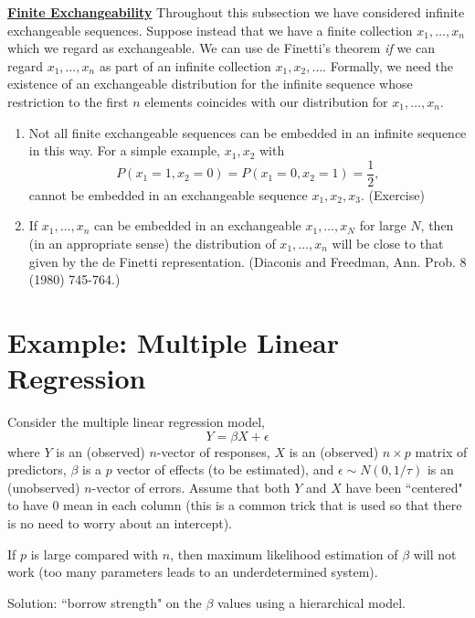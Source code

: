\documentclass{article}
\begin{document}
\newpage

\underline{\bf Finite Exchangeability}
\vskip 4mm
Throughout this subsection we have considered infinite exchangeable
sequences.  Suppose instead that we have a finite collection
$x_1,\ldots,x_n$ which we regard as exchangeable.  We can use de
Finetti's theorem {\it if} we can regard $x_1,\ldots,x_n$ as part of an
infinite collection $x_1,x_2,\ldots$.  Formally, we need the existence of
an exchangeable distribution for the infinite sequence whose
restriction to the first $n$ elements coincides with our distribution
for $x_1,\ldots,x_n$.
\begin{enumerate}
\item Not all finite exchangeable sequences can be embedded in an infinite
sequence in this way.  For a simple example, $x_1,x_2$ with
$$P(x_1=1,x_2=0)=P(x_1=0,x_2=1)=\frac{1}{2},$$
cannot be embedded in an exchangeable sequence
$x_1,x_2,x_3$. (Exercise)
\item If $x_1,\ldots,x_n$ can be embedded in an exchangeable
  $x_1,\ldots,x_N$ for large $N$, then (in an appropriate sense) the
  distribution of $x_1,\ldots,x_n$ will be close to that given by the
  de Finetti representation.  (Diaconis and Freedman, Ann. Prob. 8
  (1980) 745-764.)
\end{enumerate}

\clearpage

\section{Example: Multiple Linear Regression}

Consider the multiple linear regression model,
\begin{equation}
Y = \beta X + \epsilon
\end{equation}
where $Y$ is an (observed) $n$-vector of responses, $X$ is an 
(observed) $n \times p$ matrix
of predictors, $\beta$ is a $p$ vector of effects (to be estimated), and $\epsilon \sim N(0,1/\tau)$ is an (unobserved) $n$-vector of errors.
Assume that both $Y$ and $X$ have been ``centered" to have 0 mean in each column (this is a common trick that is used so that there is no need to worry about an intercept).

If $p$ is large compared with $n$, then maximum likelihood estimation
of $\beta$ will not work (too many parameters leads to an underdetermined system).

Solution: ``borrow strength" on the $\beta$ values using a hierarchical model.
\end{document}
